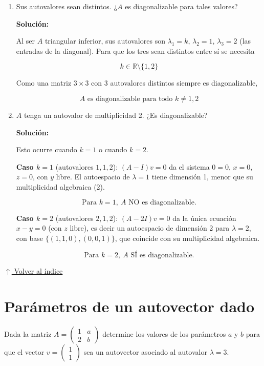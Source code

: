 \documentclass[12pt]{article}
\newcommand{\solucion}{%
    \vspace{0.8em}%
    \textbf{Solución:}%
    \vspace{0.8em}%
}
\newcommand{\volverindice}{%
    \vspace{1em}%
    \begin{flushright}%
        \hyperlink{indice}{\small $\uparrow$ Volver al índice}%
    \end{flushright}%
}
\begin{document}
\begin{enumerate}[label=\alph*.-]

    \item Sus autovalores sean distintos. ¿$A$ es diagonalizable para
    tales valores?

    \solucion

    Al ser $A$ triangular inferior, sus autovalores son
    $\lambda_1=k$, $\lambda_2=1$, $\lambda_3=2$ (las entradas de la
    diagonal). Para que los tres sean distintos entre sí se necesita

    \[
    \boxed{k\in\mathbb{R}\setminus\{1,2\}}
    \]

    Como una matriz $3\times3$ con 3 autovalores distintos siempre es
    diagonalizable,

    \[
    \boxed{A \text{ es diagonalizable para todo } k\neq1,2}
    \]


    \item $A$ tenga un autovalor de multiplicidad 2. ¿Es
    diagonalizable?

    \solucion

    Esto ocurre cuando $k=1$ o cuando $k=2$.

    \textbf{Caso $k=1$} (autovalores $1,1,2$): $(A-I)v=0$ da el
    sistema $0=0$, $x=0$, $z=0$, con $y$ libre. El autoespacio de
    $\lambda=1$ tiene dimensión 1, menor que su multiplicidad
    algebraica (2).

    \[
    \boxed{\text{Para } k=1,\ A \text{ NO es diagonalizable.}}
    \]

    \textbf{Caso $k=2$} (autovalores $2,1,2$): $(A-2I)v=0$ da la
    única ecuación $x-y=0$ (con $z$ libre), es decir un autoespacio de
    dimensión 2 para $\lambda=2$, con base $\{(1,1,0),(0,0,1)\}$, que
    coincide con su multiplicidad algebraica.

    \[
    \boxed{\text{Para } k=2,\ A \text{ SÍ es diagonalizable.}}
    \]

\end{enumerate}

\volverindice
\newpage


\section{Parámetros de un autovector dado}

Dada la matriz $A=\begin{pmatrix}1&a\\2&b\end{pmatrix}$ determine los
valores de los parámetros $a$ y $b$ para que el vector
$v=\begin{pmatrix}1\\1\end{pmatrix}$ sea un autovector asociado al
autovalor $\lambda=3$.
\end{document}
